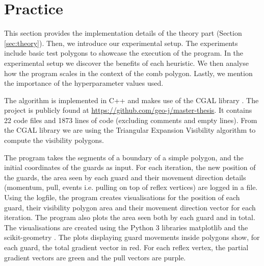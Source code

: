 \section{Practice}
\label{sec:experiments}


This section provides the implementation details of the theory part (Section \ref{sec:theory}). Then, we  introduce our experimental setup. The experiments include basic test polygons to showcase the execution of the program. In the experimental setup we discover the benefits of each heuristic. We then analyse how the program scales in the context of the comb polygon. Lastly, we  mention the importance of the hyperparameter values used.

The algorithm is implemented in C++ and makes use of the CGAL library \cite{cgal}. The project is publicly found at \url{https://github.com/geo-j/master-thesis}. It contains 22 code files and 1873 lines of code (excluding comments and empty lines).
From the CGAL library we are using the Triangular Expansion Visibility algorithm \cite{DBLP:journals/corr/BungiuHHHK14} to compute the visibility polygons.

The program takes the segments of a boundary of a simple polygon, and the initial coordinates of the guards as input. For each iteration, the new position of the guards, the area seen by each guard and their movement direction details (momentum, pull, events i.e. pulling on top of reflex vertices) are logged in a file. Using the logfile, the program creates visualisations for the position of each guard, their visibility polygon area and their movement direction vector for each iteration. The program also plots the area seen both by each guard and in total. The visualisations are created using the Python 3 libraries matplotlib \cite{matplotlib} and the scikit-geometry \cite{scikit-geometry}.
The plots displaying guard movements inside polygons show, for each guard, the total gradient vector in red. For each reflex vertex, the partial gradient vectors are  green and the pull vectors are purple.




